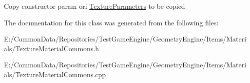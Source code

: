 Copy constructor param ori \mbox{\hyperlink{class_geometry_engine_1_1_geometry_material_1_1_texture_parameters}{Texture\+Parameters}} to be copied 

The documentation for this class was generated from the following files\+:\begin{DoxyCompactItemize}
\item 
E\+:/\+Common\+Data/\+Repositories/\+Test\+Game\+Engine/\+Geometry\+Engine/\+Items/\+Materials/Texture\+Material\+Commons.\+h\item 
E\+:/\+Common\+Data/\+Repositories/\+Test\+Game\+Engine/\+Geometry\+Engine/\+Items/\+Materials/Texture\+Material\+Commons.\+cpp\end{DoxyCompactItemize}
